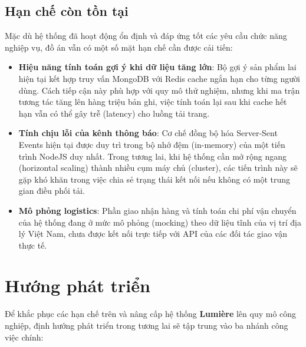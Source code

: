 \documentclass[../DoAn.tex]{subfiles}
\begin{document}
\subsection{Hạn chế còn tồn tại}

Mặc dù hệ thống đã hoạt động ổn định và đáp ứng tốt các yêu cầu chức năng nghiệp vụ, đồ án vẫn có một số mặt hạn chế cần được cải tiến:
\begin{itemize}
    \item \textbf{Hiệu năng tính toán gợi ý khi dữ liệu tăng lớn}: Bộ gợi ý sản phẩm lai hiện tại kết hợp truy vấn MongoDB với Redis cache ngắn hạn cho từng người dùng. Cách tiếp cận này phù hợp với quy mô thử nghiệm, nhưng khi ma trận tương tác tăng lên hàng triệu bản ghi, việc tính toán lại sau khi cache hết hạn vẫn có thể gây trễ (latency) cho luồng tải trang.
    \item \textbf{Tính chịu lỗi của kênh thông báo}: Cơ chế đồng bộ hóa Server-Sent Events hiện tại được duy trì trong bộ nhớ đệm (in-memory) của một tiến trình NodeJS duy nhất. Trong tương lai, khi hệ thống cần mở rộng ngang (horizontal scaling) thành nhiều cụm máy chủ (cluster), các tiến trình này sẽ gặp khó khăn trong việc chia sẻ trạng thái kết nối nếu không có một trung gian điều phối tải.
    \item \textbf{Mô phỏng logistics}: Phần giao nhận hàng và tính toán chi phí vận chuyển của hệ thống đang ở mức mô phỏng (mocking) theo dữ liệu tĩnh của vị trí địa lý Việt Nam, chưa được kết nối trực tiếp với API của các đối tác giao vận thực tế.
\end{itemize}

\section{Hướng phát triển}

Để khắc phục các hạn chế trên và nâng cấp hệ thống \textbf{Lumière} lên quy mô công nghiệp, định hướng phát triển trong tương lai sẽ tập trung vào ba nhánh công việc chính:
\end{document}
